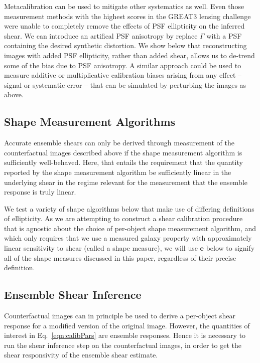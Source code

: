 \documentclass[iop]{emulateapj}
\newcommand\rmcomment[1]{\textcolor{red}{(RM: #1)}}
\begin{document}
Metacalibration can be used to mitigate other systematics as
well. Even those measurement methods with the highest scores in the
GREAT3 lensing challenge were unable to completely remove the effects
of PSF ellipticity on the inferred shear. We can introduce an
artifical PSF anisotropy by replace $\Gamma$ with a PSF containing the
desired synthetic distortion.  We show below that reconstructing
images with added PSF ellipticity, rather than added shear, allows us
to de-trend some of the bias due to PSF anisotropy. A similar approach
could be used to measure additive or multiplicative calibration biases
arising from any effect -- signal or systematic error -- that can be
simulated by perturbing the images as above.


\subsection{Shape Measurement Algorithms}
\label{subsec:shapemeas}
Accurate ensemble shears can only be derived through measurement of
the counterfactual images described above if the shape measurement
algorithm is sufficiently well-behaved. Here, that entails the
requirement that the quantity reported by the shape measurement
algorithm be sufficiently linear in the underlying shear in the regime
relevant for the measurement that the ensemble response is truly
linear.


We test a variety of shape algorithms below that make use of differing
definitions of ellipticity. As we are attempting to construct a shear
calibration procedure that is agnostic about the choice of per-object
shape measurement algorithm, and which only requires that we use a
measured galaxy property with approximately linear sensitivity to
shear (called a shape measure), we will use $\mathbf{e}$ below to
signify all of the shape measures discussed in this paper, regardless
of their precise definition.

\subsection{Ensemble Shear Inference}
Counterfactual images can in principle be used to derive a per-object
shear response for a modified version of the original image.  However,
the quantities of interest in Eq.~\ref{eqn:calibPars} are ensemble
responses.  Hence it is necessary to run the shear inference
step on the counterfactual images, in order to get the shear
responsivity of the ensemble shear estimate.
\end{document}
